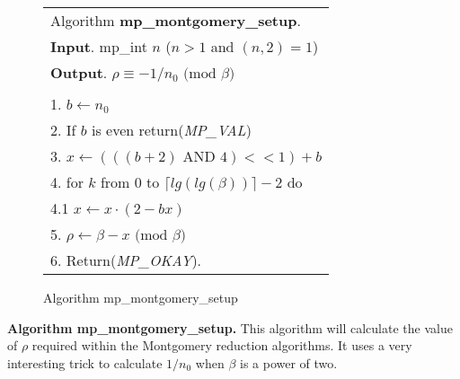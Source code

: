 \documentclass[b5paper]{book}
\begin{document}
\begin{figure}[!here]
\begin{small}
\begin{center}
\begin{tabular}{l}
\hline Algorithm \textbf{mp\_montgomery\_setup}. \\
\textbf{Input}.   mp\_int $n$ ($n > 1$ and $(n, 2) = 1$) \\
\textbf{Output}.  $\rho \equiv -1/n_0 \mbox{ (mod }\beta\mbox{)}$ \\
\hline \\
1.  $b \leftarrow n_0$ \\
2.  If $b$ is even return(\textit{MP\_VAL}) \\
3.  $x \leftarrow (((b + 2) \mbox{ AND } 4) << 1) + b$ \\
4.  for $k$ from 0 to $\lceil lg(lg(\beta)) \rceil - 2$ do \\
\hspace{3mm}4.1  $x \leftarrow x \cdot (2 - bx)$ \\
5.  $\rho \leftarrow \beta - x \mbox{ (mod }\beta\mbox{)}$ \\
6.  Return(\textit{MP\_OKAY}). \\
\hline
\end{tabular}
\end{center}
\end{small}
\caption{Algorithm mp\_montgomery\_setup} 
\end{figure}

\textbf{Algorithm mp\_montgomery\_setup.}
This algorithm will calculate the value of $\rho$ required within the Montgomery reduction algorithms.  It uses a very interesting trick 
to calculate $1/n_0$ when $\beta$ is a power of two.  
\end{document}
